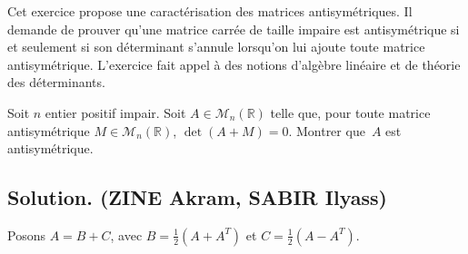 Cet exercice propose une caract{\'e}risation des matrices antisym{\'e}triques.
Il demande de prouver qu'une matrice carr{\'e}e de taille impaire est
antisym{\'e}trique si et seulement si son d{\'e}terminant s'annule lorsqu'on
lui ajoute toute matrice antisym{\'e}trique. L'exercice fait appel {\`a} des
notions d'alg{\`e}bre lin{\'e}aire et de th{\'e}orie des d{\'e}terminants.
\begin{exercise}
Soit $n$ entier positif impair. Soit $A \in \mathcal{M}_n (\mathbb{R})$ telle
que, pour toute matrice antisym{\'e}trique $M \in \mathcal{M}_n (\mathbb{R})$,
$\det (A + M) = 0$. Montrer que~$A$ est antisym{\'e}trique.
\end{exercise}
\subsection*{Solution. (ZINE Akram, SABIR Ilyass)}


Posons $A = B + C$, avec $B = \frac{1}{2} (A + A^T)$ et $C = \frac{1}{2} (A -
A^T)$.

